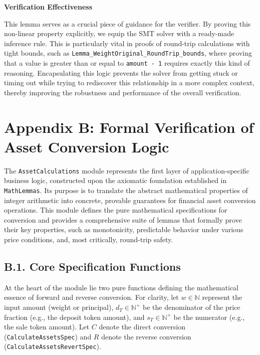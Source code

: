 \documentclass[
  english,
  onecolumn]{article}
\begin{document}
\textbf{Verification Effectiveness}

This lemma serves as a crucial piece of guidance for the verifier. By
proving this non-linear property explicitly, we equip the SMT solver
with a ready-made inference rule. This is particularly vital in proofs
of round-trip calculations with tight bounds, such as
\texttt{Lemma\_WeightOriginal\_RoundTrip\_bounds}, where proving that a
value is greater than or equal to \texttt{amount\ -\ 1} requires exactly
this kind of reasoning. Encapsulating this logic prevents the solver
from getting stuck or timing out while trying to rediscover this
relationship in a more complex context, thereby improving the robustness
and performance of the overall verification.

\section{Appendix B: Formal Verification of Asset Conversion
Logic}\label{appendix-b-formal-verification-of-asset-conversion-logic}

The \texttt{AssetCalculations} module represents the first layer of
application-specific business logic, constructed upon the axiomatic
foundation established in \texttt{MathLemmas}. Its purpose is to
translate the abstract mathematical properties of integer arithmetic
into concrete, provable guarantees for financial asset conversion
operations. This module defines the pure mathematical specifications for
conversion and provides a comprehensive suite of lemmas that formally
prove their key properties, such as monotonicity, predictable behavior
under various price conditions, and, most critically, round-trip safety.

\subsection{B.1. Core Specification
Functions}\label{b.1.-core-specification-functions}

At the heart of the module lie two pure functions defining the
mathematical essence of forward and reverse conversion. For clarity, let
\(w \in \mathbb{N}\) represent the input amount (weight or principal),
\(d_T \in \mathbb{N}^+\) be the denominator of the price fraction (e.g.,
the deposit token amount), and \(s_T \in \mathbb{N}^+\) be the numerator
(e.g., the sale token amount). Let \(C\) denote the direct conversion
(\texttt{CalculateAssetsSpec}) and \(R\) denote the reverse conversion
(\texttt{CalculateAssetsRevertSpec}).
\end{document}
